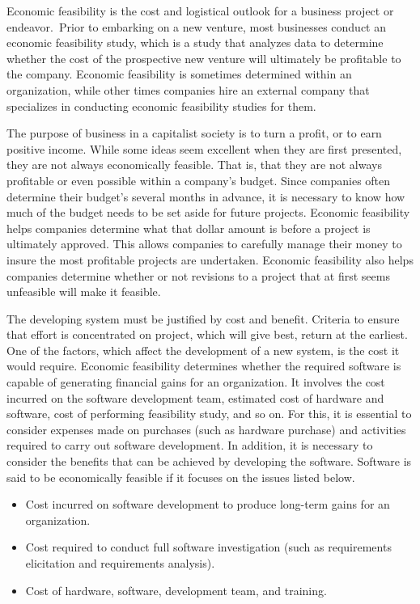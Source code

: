 Economic feasibility is the cost and logistical outlook for a business project or endeavor. Prior to embarking on a new venture, most businesses conduct an economic feasibility study, which is a study that analyzes data to determine whether the cost of the prospective new venture will ultimately be profitable to the company. Economic feasibility is sometimes determined within an organization, while other times companies hire an external company that specializes in conducting economic feasibility studies for them.

The purpose of business in a capitalist society is to turn a profit, or to earn positive income. While some ideas seem excellent when they are first presented, they are not always economically feasible. That is, that they are not always profitable or even possible within a company's budget. Since companies often determine their budget's several months in advance, it is necessary to know how much of the budget needs to be set aside for future projects. Economic feasibility helps companies determine what that dollar amount is before a project is ultimately approved. This allows companies to carefully manage their money to insure the most profitable projects are undertaken. Economic feasibility also helps companies determine whether or not revisions to a project that at first seems unfeasible will make it feasible.

The developing system must be justified by cost and benefit. Criteria to ensure that effort is concentrated on project, which will give best, return at the earliest. One of the factors, which affect the development of a new system, is the cost it would require. Economic feasibility determines whether the required software is capable of generating financial gains for an organization. It involves the cost incurred on the software development team, estimated cost of hardware and software, cost of performing feasibility study, and so on. For this, it is essential to consider expenses made on purchases (such as hardware purchase) and activities required to carry out software development. In addition, it is necessary to consider the benefits that can be achieved by developing the software. Software is said to be economically feasible if it focuses on the issues listed below.
\begin{itemize}
	\item Cost incurred on software development to produce long-term gains for an organization.
	\item Cost required to conduct full software investigation (such as requirements elicitation and requirements analysis).
	\item Cost of hardware, software, development team, and training.
\end{itemize}

